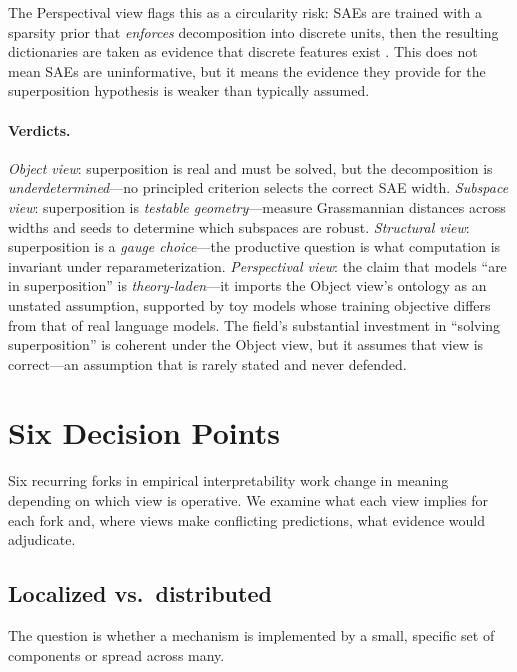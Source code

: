 \documentclass{article}
\begin{document}
The Perspectival view flags this as a circularity risk: SAEs are trained with a sparsity prior that \emph{enforces} decomposition into discrete units, then the resulting dictionaries are taken as evidence that discrete features exist \citep{leask2025}. This does not mean SAEs are uninformative, but it means the evidence they provide for the superposition hypothesis is weaker than typically assumed.

\paragraph{Verdicts.}
\emph{Object view}: superposition is real and must be solved, but the decomposition is \emph{underdetermined}---no principled criterion selects the correct SAE width.
\emph{Subspace view}: superposition is \emph{testable geometry}---measure Grassmannian distances across widths and seeds to determine which subspaces are robust.
\emph{Structural view}: superposition is a \emph{gauge choice}---the productive question is what computation is invariant under reparameterization.
\emph{Perspectival view}: the claim that models ``are in superposition'' is \emph{theory-laden}---it imports the Object view's ontology as an unstated assumption, supported by toy models whose training objective differs from that of real language models.
The field's substantial investment in ``solving superposition'' is coherent under the Object view, but it assumes that view is correct---an assumption that is rarely stated and never defended.

\section{Six Decision Points}\label{sec:decisions}

Six recurring forks in empirical interpretability work change in
meaning depending on which view is operative.  We examine what each
view implies for each fork and, where views make conflicting predictions,
what evidence would adjudicate.

\subsection{Localized vs.\ distributed}

The question is whether a mechanism is implemented by a small, specific
set of components or spread across many.
\end{document}
